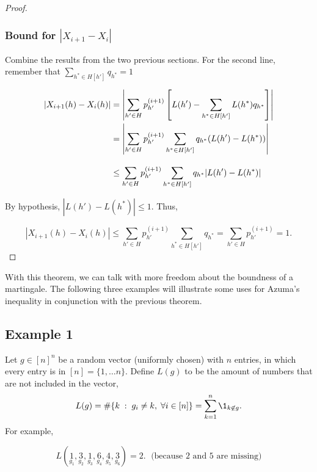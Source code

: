 \begin{proof}
\subsubsection*{Bound for $|X_{i+1}- X_i|$}
Combine the results from the two previous sections. For the second line, remember that $\sum_{h^*\in H[h']} q_{h^*} = 1$
\[ \everymath{\displaystyle}\arraycolsep=1.4pt\def\arraystretch{2.9} 
\begin{array}{rcl}
    |X_{i+1}(h)- X_i(h)| & = & \left|\sum_{h' \in H}p_{h'}^{(i+1)} \left[ L(h') - \sum_{h^* \in H[h']}  L(h^*)q_{h^*}\right] \right|\\
    & = & \left|\sum_{h' \in H}p_{h'}^{(i+1)} \sum_{h^* \in H[h']} q_{h^*}(L(h') - L(h^*)) \right|\\
    & \leq & \sum_{h' \in H}p_{h'}^{(i+1)} \sum_{h^* \in H[h']} q_{h^*} |L(h') - L(h^*)|
\end{array} \] 

By hypothesis, $|L(h') - L(h^*)| \leq 1$. Thus,

\[|X_{i+1}(h)- X_i(h)| \leq  \sum_{h' \in H}p_{h'}^{(i+1)} \sum_{h^* \in H[h']} q_{h^*} = \sum_{h' \in H}p_{h'}^{(i+1)} = 1. \] 

\end{proof}

With this theorem, we can talk with more freedom about the boundness of a martingale. The following three examples will illustrate some uses for Azuma's inequality in conjunction with the previous theorem.

\subsection*{Example 1}
Let $g \in {[n]}^{n}$ be a random vector (uniformly chosen) with $n$ entries, in which every entry is in $[n] = \{1,\ldots n\}$. Define $L(g)$ to be the amount of numbers that are not included in the vector,
\[ L(g) = \# \{ k \;:\; g_i \neq k,\; \forall i \in [n]\} = \sum_{k = 1}^{n} \1_{k \not\in g}. \] 
For example,

\[ L(\underset{g_1}{1},\underset{g_2}{3},\underset{g_3}{1},\underset{g_4}{6},\underset{g_5}{4},\underset{g_6}{3}) = 2.\;\text{ (because 2 and 5 are missing)} \]

